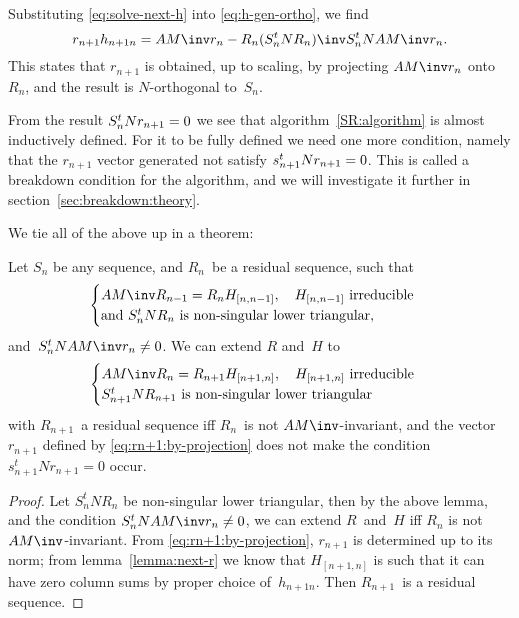 \documentclass[11pt]{artikel3}
\begin{document}
\begin{Outline}
Substituting \eqref{eq:solve-next-h} into \eqref{eq:h-gen-ortho},
we find
\begin{equation}
 r_{n+1}h_{n+1n}=AM\inv r_n-R_n(S_n^tN R_n)\inv S_n^tN AM\inv r_n.
    \label{eq:rn+1:by-projection}\end{equation}
This states that $r_{n+1}$ is obtained, up to scaling,
by projecting $AM\inv r_n$ onto $R_n$,
and the result is $N$-orthogonal to~$S_n$.

\begin{comment}
A sufficient condition for lemma~\ref{lemma:next-r} would be 
for $S_n^tM\inv R_n$ to be non-singular,
but it is the lower triangular case we are interested in.
\end{comment}
From the result $S_n^tN r_{n+1}=\nobreak0$ we see that
algorithm~\ref{SR:algorithm} is almost inductively defined.  For it to
be fully defined we need one more condition, namely that the $r_{n+1}$
vector generated not satisfy $s_{n+1}^tN r_{n+1}=\nobreak0$. This
is called a breakdown condition for the algorithm, and we will
investigate it further in section~\ref{sec:breakdown:theory}.

We tie all of the above up in a theorem:

\begin{theorem}\label{cor:next-r}
Let $S_n$ be any sequence, and $R_n$~be a residual sequence, such that 
\[ \begin{cases}AM\inv R_{n-1}=R_nH_{[n,n-1]},
                \quad\hbox{$H_{[n,n-1]}$ irreducible}\cr
    \hbox{and $S_n^tN R_n$ is non-singular lower triangular},\end{cases} \]
and~$S_n^tN AM\inv r_n\not=0$.
We can extend $R$ and~$H$ to 
\[ \begin{cases}AM\inv R_n=R_{n+1}H_{[n+1,n]},
                \quad\hbox{$H_{[n+1,n]}$ irreducible}\cr
 \hbox{$S_{n+1}^tN R_{n+1}$ is non-singular lower triangular}\end{cases} \]
with $R_{n+1}$~a residual sequence iff $R_n$~is not $AM\inv $-invariant,
and the vector $r_{n+1}$ defined by \eqref{eq:rn+1:by-projection}
does not make the condition $s_{n+1}^tN r_{n+1}=0$ occur.
\end{theorem}
\begin{proof} Let $S_n^tN R_n$ be non-singular lower triangular, then by
the above lemma, and the condition $S_n^tN AM\inv r_n\not=0$,
we can extend $R$~and~$H$ iff $R_n$ is not $AM\inv$-invariant.
From \eqref{eq:rn+1:by-projection}, $r_{n+1}$ is determined up to its
norm; from lemma~\ref{lemma:next-r} we know that $H_{[n+1,n]}$ is such
that it can have zero column sums by proper choice of~$h_{n+1n}$.
Then $R_{n+1}$~is a residual sequence.


\end{proof}
\end{Outline}
\end{document}
